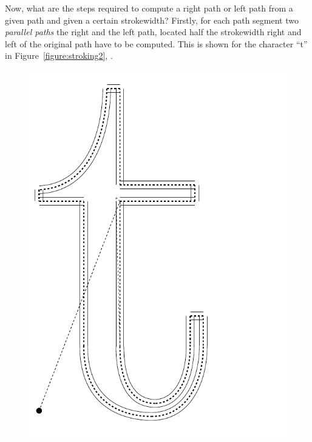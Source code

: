 Now, what are the steps required to compute a right path or left path from a
given path and given a certain strokewidth? Firstly, for each path segment two
{\em parallel paths} the right and the left path, located half the strokewidth
right and left of the original path have to be computed. This is shown for the
character ``t'' in Figure~\ref{figure:stroking2}, .
\begin{figure}[t]
\hfill
{}\includegraphics[scale=0.5]{t1dump/t1dump_t_1}
\hfill

\end{figure}
